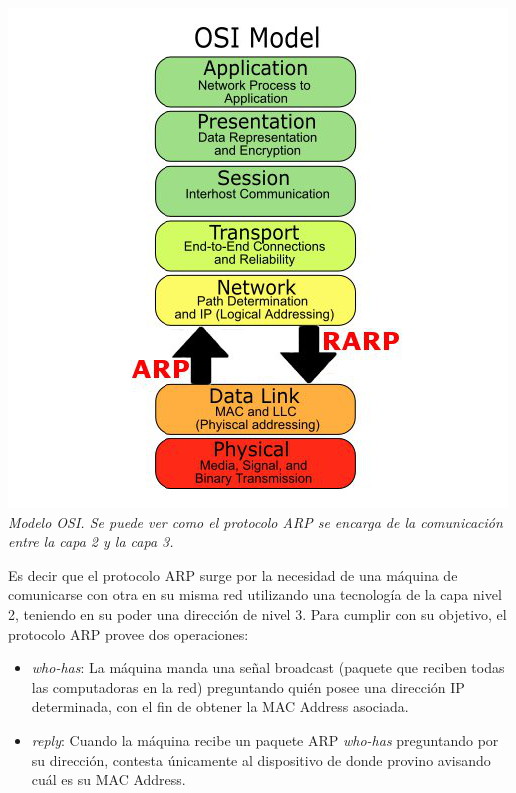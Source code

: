 \vspace{\baselineskip}
        \begin{center}
        \includegraphics[scale=0.40]{osimodel.jpeg}
        \\
        \vspace{1pt}
        \footnotesize\textit{Modelo OSI. Se puede ver como el protocolo ARP se encarga de la comunicación entre la capa 2 y la capa 3.}
      \end{center}
    \vspace{\baselineskip}
\par

Es decir que el protocolo ARP surge por la necesidad de una máquina de comunicarse con otra en su misma red utilizando una tecnología de la capa nivel 2, teniendo en su poder una dirección de nivel 3. Para cumplir con su objetivo, el protocolo ARP provee dos operaciones:

\begin{itemize}
\item \textit{who-has}: La máquina manda una señal broadcast (paquete que reciben todas las computadoras en la red) preguntando quién posee una dirección IP determinada, con el fin de obtener la MAC Address asociada.
\item \textit{reply}: Cuando la máquina recibe un paquete ARP \textit{who-has} preguntando por su dirección, contesta únicamente al dispositivo de donde provino avisando cuál es su MAC Address.
\end{itemize}

